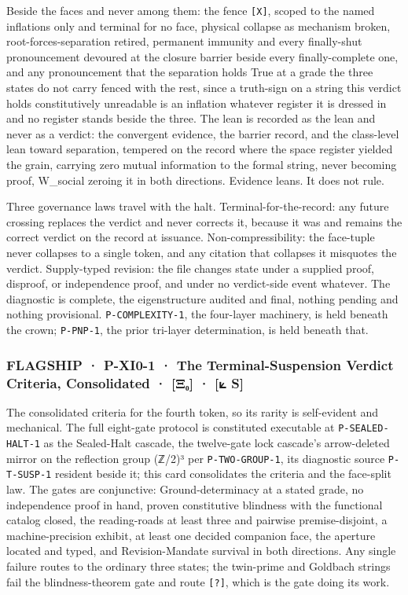 \documentclass[10pt,twocolumn]{article}
\begin{document}
Beside the faces and never among them: the fence \texttt{{[}X{]}},
scoped to the named inflations only and terminal for no face, physical
collapse as mechanism broken, root-forces-separation retired, permanent
immunity and every finally-shut pronouncement devoured at the closure
barrier beside every finally-complete one, and any pronouncement that
the separation holds True at a grade the three states do not carry
fenced with the rest, since a truth-sign on a string this verdict holds
constitutively unreadable is an inflation whatever register it is
dressed in and no register stands beside the three. The lean is recorded
as the lean and never as a verdict: the convergent evidence, the barrier
record, and the class-level lean toward separation, tempered on the
record where the space register yielded the grain, carrying zero mutual
information to the formal string, never becoming proof, W\_social
zeroing it in both directions. Evidence leans. It does not rule.

Three governance laws travel with the halt. Terminal-for-the-record: any
future crossing replaces the verdict and never corrects it, because it
was and remains the correct verdict on the record at issuance.
Non-compressibility: the face-tuple never collapses to a single token,
and any citation that collapses it misquotes the verdict. Supply-typed
revision: the file changes state under a supplied proof, disproof, or
independence proof, and under no verdict-side event whatever. The
diagnostic is complete, the eigenstructure audited and final, nothing
pending and nothing provisional. \texttt{P-COMPLEXITY-1}, the four-layer
machinery, is held beneath the crown; \texttt{P-PNP-1}, the prior
tri-layer determination, is held beneath that.

\hypertarget{flagship-p-xi0-1-the-terminal-suspension-verdict-criteria-consolidated-ux3beux2080-s}{%
\subsubsection{FLAGSHIP · P-XI0-1 · The Terminal-Suspension Verdict
Criteria, Consolidated · {[}Ξ₀{]} · {[}⟀
S{]}}\label{flagship-p-xi0-1-the-terminal-suspension-verdict-criteria-consolidated-ux3beux2080-s}}

The consolidated criteria for the fourth token, so its rarity is
self-evident and mechanical. The full eight-gate protocol is constituted
executable at \texttt{P-SEALED-HALT-1} as the Sealed-Halt cascade, the
twelve-gate lock cascade's arrow-deleted mirror on the reflection group
(ℤ/2)³ per \texttt{P-TWO-GROUP-1}, its diagnostic source
\texttt{P-T-SUSP-1} resident beside it; this card consolidates the
criteria and the face-split law. The gates are conjunctive:
Ground-determinacy at a stated grade, no independence proof in hand,
proven constitutive blindness with the functional catalog closed, the
reading-roads at least three and pairwise premise-disjoint, a
machine-precision exhibit, at least one decided companion face, the
aperture located and typed, and Revision-Mandate survival in both
directions. Any single failure routes to the ordinary three states; the
twin-prime and Goldbach strings fail the blindness-theorem gate and
route \texttt{{[}?{]}}, which is the gate doing its work.
\end{document}
